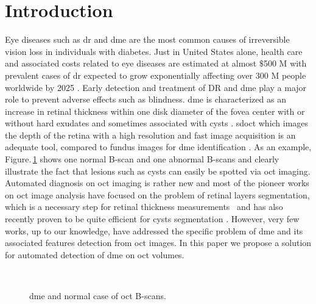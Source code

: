 \graphicspath{ {./content/intro/figures/} }

\section{Introduction}
\label{sec:intro}  %

Eye diseases such as \gls{dr} and \gls{dme} are the most common causes of irreversible vision loss in individuals with diabetes.
Just in United States alone, health care and associated costs related to eye diseases are estimated at almost $\$$500 M \cite{Sharma2005} with prevalent cases of \gls{dr} expected to grow exponentially affecting over 300 M people worldwide by 2025 \cite{wild2004global}.
Early detection and treatment of DR and \gls{dme} play a major role to prevent adverse effects such as blindness.
\gls{dme} is characterized as an increase in retinal thickness within one disk diameter of the fovea center with or without hard exudates and sometimes associated with cysts \cite{ETDRSG1985}.
\gls{sdoct} \cite{Chen2005} which images the depth of the retina with a high resolution and fast image acquisition is an adequate tool, compared to fundus images for \gls{dme} identification \cite{abramoff2010retinal,trucco2013validating,giancardo2011textureless}.
As an example, Figure.\,\ref{fig:fig1} shows one normal B-scan and one abnormal B-scans and clearly illustrate the fact that lesions such as cysts can easily be spotted via \gls{oct} imaging.
Automated diagnosis on \gls{oct} imaging is rather new and most of the pioneer works on \gls{oct} image analysis have focused on the problem of retinal layers segmentation, which is a necessary step for retinal thickness measurements~\cite{chiu2010automatic,garvin2009automated,garvin2008intraretinal} and has also recently proven to be quite efficient for cysts segmentation \cite{oguz2016optimal}. 
However, very few works, up to our knowledge, have addressed the specific problem of \gls{dme} and its associated features detection from \gls{oct} images. 
In this paper we propose a solution for automated detection of \gls{dme} on \gls{oct} volumes.

\begin{figure}
\centering
        \
\caption{\gls{dme} and normal case of \gls{oct} B-scans.}
\label{fig:fig1}
\end{figure}

